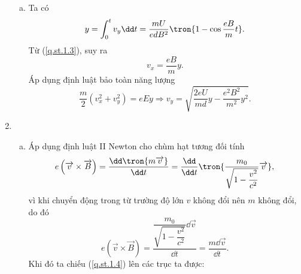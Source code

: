 \begin{loigiai}
\begin{enumerate}[1)]
\begin{enumerate}[a)]
    \item  Ta có
    \[y = \int_0^t v_y \dd t =  \dfrac{mU}{ed{{B}^{2}}} \tron{1 - \cos \dfrac{eB}{m} t}.\]
Từ (\ref{q.st.1.3}), suy ra
\[{{v}_{x}}=\dfrac{eB}{m}y.  \]
Áp dụng định luật bảo toàn năng lượng \[\dfrac{m}{2}(v_{x}^{2} + v_{y}^{2}) = {eE}y \Rightarrow {{v}_{y}} = \sqrt{\dfrac{2eU}{md}y - \dfrac{e^2B^2}{m^2} y^2}.\]
    \end{enumerate}
    \item \begin{enumerate}[a)]
        \item Áp dụng định luật II Newton cho chùm hạt tương đối tính
        \[e\left(\overrightarrow{v}\times \overrightarrow{B}\right) = \dfrac{\dd\tron{m\overrightarrow{v}}}{\dd t} = \dfrac{\dd }{\dd t}\tron{\dfrac{{{m}_{0}}}{\sqrt{1 - {{\dfrac{v^2}{c^2}}}}}\overrightarrow v},\]
    vì khi chuyển động trong từ trường độ lớn $v$ không đổi nên $m$ không đổi, do đó
\[e\left(\overrightarrow{v}\times \overrightarrow{B}\right) = \dfrac{\dfrac{{{m}_{0}}}{\sqrt{1-{{\dfrac{v^2}{c^2}}}}}\dd\overrightarrow{v}}{\dd t}=\dfrac{m \dd\overrightarrow{v}}{\dd t} \tag{4}\label{q.st.1.4}.\]
Khi đó ta chiếu (\ref{q.st.1.4}) lên các trục ta được:


\end{enumerate}
\end{enumerate}
\end{loigiai}
